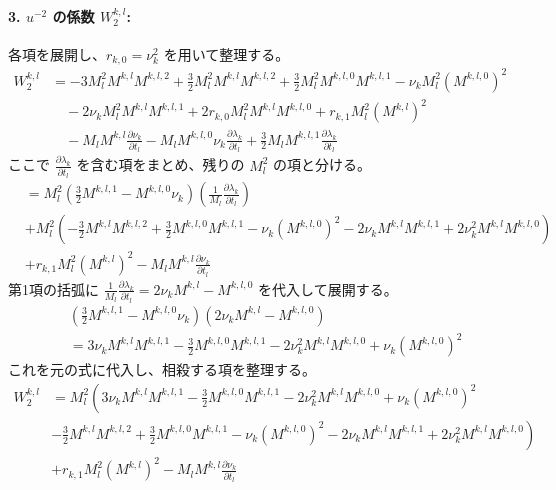 \paragraph{3. $u^{-2}$ の係数 $W_2^{k,l}$:}
各項を展開し、$r_{k,0} = \nu_k^2$ を用いて整理する。
\begin{align*}
W_2^{k,l} &= -3 M_l^2 M^{k,l} M^{k,l,2} + \frac{3}{2} M_l^2 M^{k,l} M^{k,l,2} + \frac{3}{2} M_l^2 M^{k,l,0} M^{k,l,1} - \nu_k M_l^2 (M^{k,l,0})^2\\
&\hspace{1em}- 2\nu_k M_l^2 M^{k,l} M^{k,l,1} + 2r_{k,0} M_l^2 M^{k,l} M^{k,l,0} + r_{k,1} M_l^2 (M^{k,l})^2\\
&\hspace{1em}- M_l M^{k,l} \frac{\partial \nu_k}{\partial t_l} - M_l M^{k,l,0} \nu_k \frac{\partial \lambda_k}{\partial t_l} + \frac{3}{2} M_l M^{k,l,1} \frac{\partial \lambda_k}{\partial t_l}
\end{align*}
ここで $\frac{\partial \lambda_k}{\partial t_l}$ を含む項をまとめ、残りの $M_l^2$ の項と分ける。
\begin{align*}
&= M_l^2 \left( \frac{3}{2} M^{k,l,1} - M^{k,l,0} \nu_k \right) \left( \frac{1}{M_l} \frac{\partial \lambda_k}{\partial t_l} \right)\\
&+ M_l^2 \left( -\frac{3}{2} M^{k,l} M^{k,l,2} + \frac{3}{2} M^{k,l,0} M^{k,l,1} - \nu_k (M^{k,l,0})^2 - 2\nu_k M^{k,l} M^{k,l,1} + 2\nu_k^2 M^{k,l} M^{k,l,0} \right)\\
&+ r_{k,1} M_l^2 (M^{k,l})^2 - M_l M^{k,l} \frac{\partial \nu_k}{\partial t_l}
\end{align*}
第1項の括弧に $\frac{1}{M_l} \frac{\partial \lambda_k}{\partial t_l} = 2\nu_k M^{k,l} - M^{k,l,0}$ を代入して展開する。
\begin{align*}
&\left( \frac{3}{2} M^{k,l,1} - M^{k,l,0} \nu_k \right) ( 2\nu_k M^{k,l} - M^{k,l,0} )\\
&= 3\nu_k M^{k,l} M^{k,l,1} - \frac{3}{2} M^{k,l,0} M^{k,l,1} - 2\nu_k^2 M^{k,l} M^{k,l,0} + \nu_k (M^{k,l,0})^2
\end{align*}
これを元の式に代入し、相殺する項を整理する。
\begin{align*}
W_2^{k,l} &= M_l^2 \left( 3\nu_k M^{k,l} M^{k,l,1} - \frac{3}{2} M^{k,l,0} M^{k,l,1} - 2\nu_k^2 M^{k,l} M^{k,l,0} + \nu_k (M^{k,l,0})^2 \right.\\
&\left. -\frac{3}{2} M^{k,l} M^{k,l,2} + \frac{3}{2} M^{k,l,0} M^{k,l,1} - \nu_k (M^{k,l,0})^2 - 2\nu_k M^{k,l} M^{k,l,1} + 2\nu_k^2 M^{k,l} M^{k,l,0} \right)\\
&+ r_{k,1} M_l^2 (M^{k,l})^2 - M_l M^{k,l} \frac{\partial \nu_k}{\partial t_l}
\end{align*}

